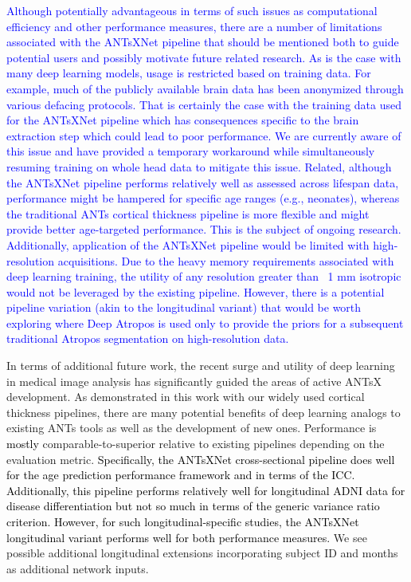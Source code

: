 \documentclass[12pt,]{article}
\begin{document}
\textcolor{blue}{
Although potentially advantageous in terms of such issues as computational
efficiency and other performance measures, there are a number of limitations
associated with the ANTsXNet pipeline that should be mentioned both to guide
potential users and possibly motivate future related research.  As is the
case with many deep learning models, usage is restricted based on training
data.  For example, much of the publicly available brain data has been
anonymized through various defacing protocols.  That is certainly the case
with the training data used for the ANTsXNet pipeline which has consequences
specific to the brain extraction step which could lead to poor performance.
We are currently aware of this issue and have provided a temporary workaround
while simultaneously resuming training on whole head data to mitigate this issue.
Related, although the ANTsXNet pipeline performs relatively well as assessed
across lifespan data, performance might be hampered for specific age ranges
(e.g., neonates), whereas the traditional ANTs cortical thickness pipeline
is more flexible and might provide better age-targeted performance.  This is the subject
of ongoing research.  Additionally, application of the ANTsXNet pipeline would
be limited with high-resolution acquisitions.  Due to the heavy memory
requirements associated with deep learning training, the utility of any
resolution greater than ~1 mm isotropic would not be leveraged by the
existing pipeline.  However, there is a potential pipeline variation (akin
to the longitudinal variant) that would be worth exploring where Deep Atropos
is used only to provide the priors for a subsequent traditional Atropos
segmentation on high-resolution data.}

In terms of additional future work, the recent surge and utility of deep
learning in medical image analysis has significantly guided the areas of
active ANTsX development. As demonstrated in this work with our widely
used cortical thickness pipelines, there are many potential benefits of
deep learning analogs to existing ANTs tools as well as the development
of new ones. Performance is \textcolor{black}{mostly}
comparable-to-superior relative to existing pipelines depending on the
evaluation metric. \textcolor{black}{Specifically, the ANTsXNet
cross-sectional pipeline does well for the age prediction performance framework
and in terms of the ICC.  Additionally, this pipeline performs relatively well
for longitudinal ADNI data for disease differentiation but not so much in terms
of the generic variance ratio criterion.  However, for such longitudinal-specific
studies, the ANTsXNet longitudinal variant performs well for both performance
measures.} We see possible additional longitudinal extensions
incorporating subject ID and months as additional network inputs.
\end{document}
